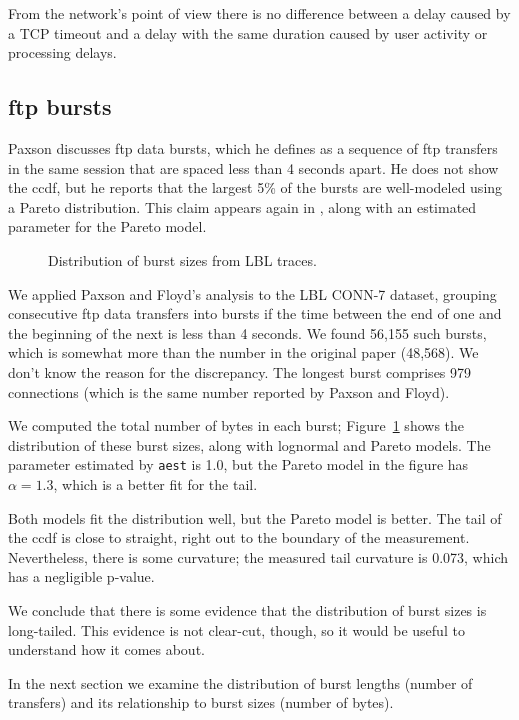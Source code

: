 \documentclass[twocolumn,11pt]{infocom}
\begin{document}
From the network's point of view there
is no difference between a delay caused by a TCP
timeout and a delay with the same duration caused by user
activity or processing delays.


\subsection {ftp bursts}

Paxson \cite{Paxson94} discusses ftp data bursts, which he defines as
a sequence of ftp transfers in the same session that are spaced less
than 4 seconds apart.  He does not show the ccdf, but he reports that the
largest 5\% of the bursts are well-modeled using a Pareto
distribution.  This claim appears again in \cite{PaxsonFloyd95}, along
with an estimated parameter for the Pareto model.


\begin{figure}[tb]
\centerline{}
\caption{Distribution of burst sizes from LBL traces.}
\label{fig.bursts}
\end{figure}

We applied Paxson and Floyd's analysis to the LBL CONN-7 dataset,
grouping consecutive ftp data transfers into bursts if the time
between the end of one and the beginning of the next is less than 4
seconds.  We found 56,155 such bursts, which is somewhat more than the
number in the original paper (48,568).  We don't know the reason for
the discrepancy.  The longest burst comprises 979 connections (which
is the same number reported by Paxson and Floyd).

We computed the total number of bytes in each burst;
Figure~\ref{fig.bursts} shows the distribution of these burst sizes,
along with lognormal and Pareto models.  The
parameter estimated by \texttt{aest} is 1.0, but the Pareto model
in the figure has $\alpha = 1.3$, which is a better fit
for the tail.

Both models fit the distribution well, but the Pareto model is
better.  The tail of the ccdf is close to straight, right out to the
boundary of the measurement.  Nevertheless, there is some curvature;
the measured tail curvature is 0.073, which has a negligible p-value.

We conclude that there is some evidence that the distribution of
burst sizes is long-tailed.  This evidence is not clear-cut, though,
so it would be useful to understand how it comes about.

In the next section we examine the distribution of burst lengths
(number of transfers) and its relationship to burst sizes (number of
bytes).
\end{document}
